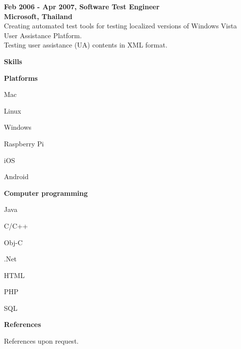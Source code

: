 \documentclass[a4paper,12pt,final]{memoir}
\newcommand{\Sep}{\vspace{1.5em}}
\newcommand{\SmallSep}{\vspace{0.5em}}
\newcommand{\CVSection}[1]
	{\Large\textbf{#1}\par
	\SmallSep\normalsize\normalfont}
\newcommand{\CVItem}[1]
	{\textbf{\color{RoyalBlue} #1}}
\begin{document}
\SmallSep

\CVItem{Feb 2006 - Apr 2007, Software Test Engineer}\\
\textbf{Microsoft, Thailand}\\
Creating automated test tools for testing localized versions of Windows Vista User Assistance Platform.\\
Testing user assistance (UA) contents in XML format.

\SmallSep
\Sep

\CVSection{Skills}
\CVItem{Platforms}
\begin{multicols}{2}
\begin{compactitem}[\color{RoyalBlue}$\circ$]
	\item Mac
    \item Linux
    \item Windows
    \item Raspberry Pi
    \item iOS
    \item Android
\end{compactitem}
\end{multicols}
\SmallSep

\CVItem{Computer programming}
\begin{multicols}{2}
\begin{compactitem}[\color{RoyalBlue}$\circ$]
	\item Java
    \item C/C++
	\item Obj-C 
	\item .Net 
	\item HTML
	\item PHP
	\item SQL
\end{compactitem}
\end{multicols}
\Sep 

\CVSection{References}
References upon request.

\end{document}
